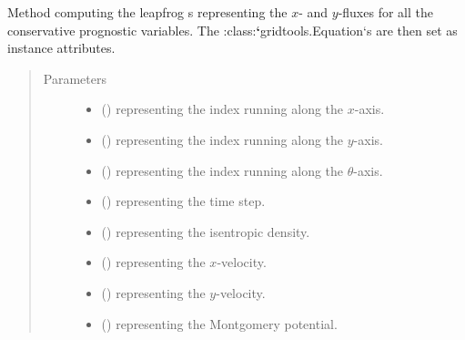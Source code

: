 \documentclass[letterpaper,10pt,english]{sphinxmanual}
\begin{document}
\begin{fulllineitems}
\begin{fulllineitems}
\label{\detokenize{api:dycore.flux_isentropic.FluxIsentropicLeapfrog._compute_fluxes}}
Method computing the leapfrog s representing the \(x\)- and \(y\)-fluxes for all
the conservative prognostic variables. The :class:{\color{red}\bfseries{}{}`}gridtools.Equation{}`s are then set as instance attributes.
\begin{quote}\begin{description}
\item[{Parameters}] \leavevmode\begin{itemize}
\item {} 
 () \textendash{}  representing the index running along the \(x\)-axis.

\item {} 
 () \textendash{}  representing the index running along the \(y\)-axis.

\item {} 
 () \textendash{}  representing the index running along the \(\theta\)-axis.

\item {} 
 () \textendash{}  representing the time step.

\item {} 
 () \textendash{}  representing the isentropic density.

\item {} 
 () \textendash{}  representing the \(x\)-velocity.

\item {} 
 () \textendash{}  representing the \(y\)-velocity.

\item {} 
 () \textendash{}  representing the Montgomery potential.


\end{itemize}
\end{description}
\end{quote}
\end{fulllineitems}
\end{fulllineitems}
\end{document}
